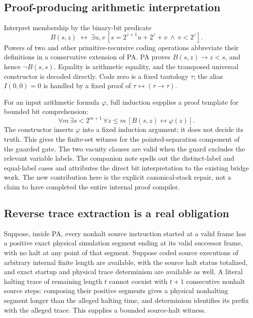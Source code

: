 \documentclass[11pt,letterpaper]{article}
\begin{document}
\subsection{Proof-producing arithmetic interpretation}

Interpret membership by the binary-bit predicate
\[
 B(s,z)\;\leftrightarrow\;
 \exists u,v\,[s=2^{z+1}u+2^z+v\ \wedge\ v<2^z].
\]
Powers of two and other primitive-recursive coding operations abbreviate
their definitions in a conservative extension of PA.
PA proves $B(s,z)\to z<s$, and hence $\neg B(s,s)$. Equality is arithmetic
equality, and the transposed universal constructor is decoded directly.
Code zero is a fixed tautology $\tau$; the alias $I(0,0)=0$ is handled by
a fixed proof of $\tau\leftrightarrow(\tau\to\tau)$.

For an input arithmetic formula $\varphi$, full induction supplies a
proof template for bounded bit comprehension:
\[
 \forall m\,\exists s<2^{m+1}\,\forall z\le m\,
       [B(s,z)\leftrightarrow\varphi(z)].
\]
The constructor inserts $\varphi$ into a fixed induction argument; it
does not decide its truth. This gives the finite-set witness for the
pointed-separation component of the guarded gate. The two vacuity clauses
are valid when the guard excludes the relevant variable labels. The
companion note spells out the distinct-label and equal-label cases and
attributes the direct bit interpretation to the existing bridge work.
The new contribution here is the explicit canonical-stack repair, not a
claim to have completed the entire internal proof compiler.

\subsection{Reverse trace extraction is a real obligation}

Suppose, inside PA, every nonhalt source instruction started at a valid frame
has a positive exact physical simulation segment ending at its valid
successor frame, with no halt at any point of that segment. Suppose coded
source executions of arbitrary internal finite length are available, with
the source halt status totalized, and exact startup and physical trace
determinism are available as well. A literal
halting trace of remaining length $t$ cannot coexist with $t+1$ consecutive
nonhalt source steps: composing their positive segments gives a physical
nonhalting segment longer than the alleged halting time, and determinism
identifies its prefix with the alleged trace. This supplies a bounded
source-halt witness.
\end{document}
